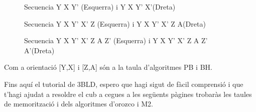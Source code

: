 \begin{figure}[h!]
    \centering
    \begin{subfigure}
        \centering\RubikCubeSolvedWY
    \end{subfigure}
    \begin{subfigure}
        \centering\RubikCubeSolvedWY
    \end{subfigure}
    \caption{Secuencia Y X Y' (Esquerra) i Y X Y' X'(Dreta)}
\end{figure}

\begin{figure}[h!]
    \centering
    \begin{subfigure}
        \centering\RubikCubeSolvedWY
    \end{subfigure}
    \begin{subfigure}
        \centering\RubikCubeSolvedWY
    \end{subfigure}
    \caption{Secuencia Y X Y' X' Z (Esquerra) i Y X Y' X' Z A(Dreta)}
\end{figure}

\begin{figure}[h!]
    \centering
    \begin{subfigure}
        \centering\RubikCubeSolvedWY
    \end{subfigure}
    \begin{subfigure}
        \centering\RubikCubeSolvedWY
    \end{subfigure}
    \caption{Secuencia Y X Y' X' Z A Z' (Esquerra) i Y X Y' X' Z A Z' A'(Dreta)}
\end{figure}

Com a orientació [Y,X] i [Z,A] són a la taula d'algoritmes PB i BH.

\newpage
\large{Fins aquí el tutorial de 3BLD, espero que hagi sigut de fàcil comprensió i que t'hagi ajudat a resoldre el cub a cegues a les següents pàgines trobaràs les taules de memorització i dels algoritmes d'orozco i M2.}